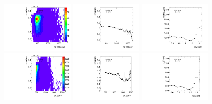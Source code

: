 \begin{figure}[htbp!]
\begin{center}
\includegraphics[width=0.32\textwidth,angle=-90]{figures/boosted/AppendixReweight/Weights/2Trk_split_Sideband_mHH_l_weight.pdf}
\includegraphics[width=0.32\textwidth,angle=-90]{figures/boosted/AppendixReweight/Weights/2Trk_split_Sideband_mHH_l_weight_profx.pdf}
\includegraphics[width=0.32\textwidth,angle=-90]{figures/boosted/AppendixReweight/Weights/2Trk_split_Sideband_mHH_l_weight_profy.pdf}\\
\includegraphics[width=0.32\textwidth,angle=-90]{figures/boosted/AppendixReweight/Weights/2Trk_split_Sideband_leadHCand_Pt_m_weight.pdf}
\includegraphics[width=0.32\textwidth,angle=-90]{figures/boosted/AppendixReweight/Weights/2Trk_split_Sideband_leadHCand_Pt_m_weight_profx.pdf}
\includegraphics[width=0.32\textwidth,angle=-90]{figures/boosted/AppendixReweight/Weights/2Trk_split_Sideband_leadHCand_Pt_m_weight_profy.pdf}\\

\end{center}
\end{figure}
